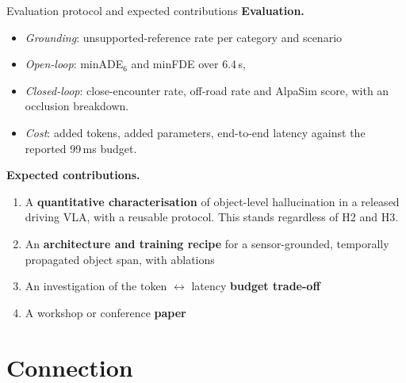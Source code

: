 \documentclass[aspectratio=169,11pt,t]{beamer}
\begin{document}
\begin{frame}{Evaluation protocol and expected contributions}
  \footnotesize
  \textbf{Evaluation.}
  \begin{itemize}
    \item \emph{Grounding}: unsupported-reference rate per category and
      scenario
    \item \emph{Open-loop}: minADE$_6$ and minFDE over 6.4\,s,
    \item \emph{Closed-loop}: close-encounter rate, off-road rate and AlpaSim
      score, with an occlusion breakdown.
    \item \emph{Cost}: added tokens, added parameters, end-to-end latency
      against the reported 99\,ms budget.
  \end{itemize}

  \vspace{0.3em}
  \textbf{Expected contributions.}
  \begin{enumerate}
    \item A \textbf{quantitative characterisation} of object-level hallucination
      in a released driving VLA, with a reusable protocol. This stands
      regardless of H2 and H3.
    \item An \textbf{architecture and training recipe} for a sensor-grounded, temporally
      propagated object span, with ablations
    \item An investigation of the token $\leftrightarrow$ latency \textbf{budget trade-off}
    \item A workshop or conference \textbf{paper}
  \end{enumerate}
  \vspace{-0.4em}
\end{frame}



\section{Connection}
\end{document}
